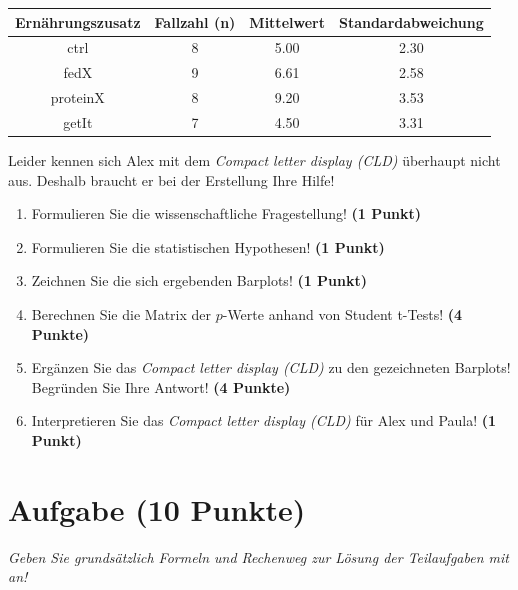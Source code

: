 \documentclass[a4paper, 9pt]{scrartcl}\usepackage[]{graphicx}\usepackage[]{xcolor}
\newenvironment{knitrout}{}{} %
\begin{document}
\begin{knitrout}
\color{fgcolor}\begin{table}[!h]
\centering\begingroup\fontsize{10}{12}\selectfont

\begin{tabular}{cccc}
\toprule
\textbf{Ernährungszusatz} & \textbf{Fallzahl (n)} & \textbf{Mittelwert} & \textbf{Standardabweichung}\\
\midrule
ctrl & 8 & 5.00 & 2.30\\
fedX & 9 & 6.61 & 2.58\\
proteinX & 8 & 9.20 & 3.53\\
getIt & 7 & 4.50 & 3.31\\
\bottomrule
\end{tabular}
\endgroup{}
\end{table}

\end{knitrout}

Leider kennen sich Alex mit dem \textit{Compact letter display (CLD)} überhaupt nicht aus. Deshalb braucht er bei der Erstellung Ihre Hilfe!

\begin{enumerate}
  \item Formulieren Sie die wissenschaftliche Fragestellung! \textbf{(1 Punkt)}
  \item Formulieren Sie die statistischen Hypothesen! \textbf{(1 Punkt)}
\item Zeichnen Sie die sich ergebenden Barplots! \textbf{(1 Punkt)}
\item Berechnen Sie die Matrix der $p$-Werte anhand von Student t-Tests! \textbf{(4 Punkte)}
\item Ergänzen Sie das \textit{Compact letter display (CLD)} zu den gezeichneten Barplots! Begründen Sie Ihre Antwort! \textbf{(4 Punkte)}
\item Interpretieren Sie das \textit{Compact letter display (CLD)} für Alex und Paula! \textbf{(1 Punkt)} 
\end{enumerate}

 
\clearpage

\section{Aufgabe \hfill (10 Punkte)}

\textit{Geben Sie grundsätzlich Formeln und Rechenweg zur Lösung der Teilaufgaben mit an!} \\[1Ex]
 
\end{document}
